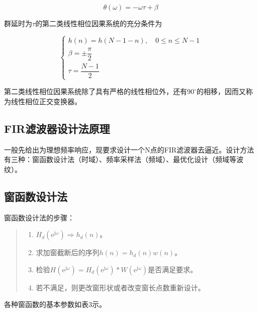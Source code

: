 \documentclass[cn, hazy, blue, normal, 14pt]{elegantnote}
\begin{document}
\begin{equation}
    \theta(\omega)=-\omega\tau+\beta
\end{equation}

群延时为$\tau$的第二类线性相位因果系统的充分条件为

\begin{equation}
    \left\{
    \begin{array}{l}
        h(n)=h(N-1-n), \quad 0\leq n\leq N-1 \\
        \beta=\pm\dfrac{\pi}{2} \\
        \tau=\dfrac{N-1}{2}
    \end{array}
    \right.
\end{equation}

第二类线性相位因果系统除了具有严格的线性相位外，还有$90^{\circ}$的相移，因而又称为线性相位正交变换器。

\subsection{FIR滤波器设计法原理}

一般先给出为理想频率响应，现要求设计一个N点的FIR滤波器去逼近。设计方法有三种：窗函数设计法（时域）、频率采样法（频域）、最优化设计（频域等波纹）。

\subsection{窗函数设计法}

窗函数设计法的步骤：

\begin{quote}
\begin{enumerate}
    \item $H_d(\text{e}^{\text{j}\omega})\Rightarrow h_d(n)$。
    \item 求加窗截断后的序列$h(n)=h_d(n)w(n)$。
    \item 检验$H(\text{e}^{\text{j}\omega})=H_d(\text{e}^{\text{j}\omega})\ast W(\text{e}^{\text{j}\omega})$是否满足要求。
    \item 若不满足，则更改窗形状或者改变窗长点数重新设计。
\end{enumerate}
\end{quote}

各种窗函数的基本参数如表3示。
\end{document}
